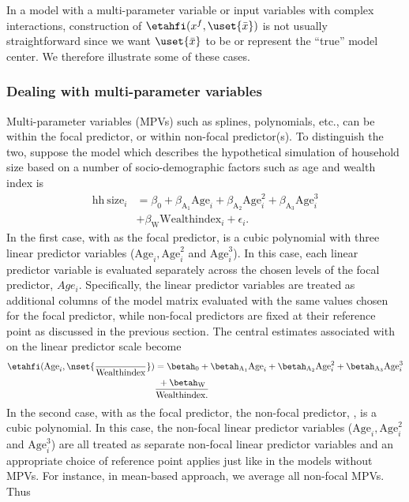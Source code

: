 In a model with a multi-parameter variable or input variables with complex interactions, construction of $\etahfi(x^f, \uset{{\bar{x}}})$ is not usually straightforward since we want $\uset{{\bar{x}}}$ to be or represent the ``true'' model center. We therefore illustrate some of these cases.

\subsubsection{Dealing with multi-parameter variables}


Multi-parameter variables (MPVs) such as splines, polynomials, etc., can be within the focal predictor, or within non-focal predictor(s). To distinguish the two, suppose the model which describes the hypothetical simulation of household size based on a number of socio-demographic factors such as age and wealth index is
%
\begin{align}\label{eq:lm_cubic}
\mathrm{hh~size}_i &= \beta_0 + \beta_{\mathrm{A_1}}\mathrm{Age}_i + \beta_{\mathrm{A_2}}\mathrm{Age}^2_i + \beta_{\mathrm{A_3}}\mathrm{Age}^3_i\nonumber \\
&+ \beta_{\mathrm{W}}\mathrm{Wealthindex}_i + \epsilon_i.
\end{align}
%
In the first case, with  as the focal predictor, is a cubic polynomial with three linear predictor variables ($\mathrm{Age}_i, \mathrm{Age}^2_i$ and $\mathrm{Age}^3_i$). In this case, each linear predictor variable is evaluated separately across the chosen levels of the focal predictor, $Age_i$. Specifically, the linear predictor variables are treated as additional columns of the model matrix evaluated with the same values chosen for the focal predictor, while non-focal predictors are fixed at their reference point as discussed in the previous section. The central estimates associated with  on the linear predictor scale become
%
\begin{align}
\etahfi(\mathrm{Age}_i, \nset{{\over{\mathrm{Wealthindex}}}}) &= \betah_0 + \betah_{\mathrm{A_1}}\mathrm{Age}_i + \betah_{\mathrm{A_2}}\mathrm{Age}^2_i + \betah_{\mathrm{A_3}}\mathrm{Age}^3_i \nonumber\\
	& + \betah_{\mathrm{W}}\over{\mathrm{Wealthindex}}.
\end{align}
%
In the second case, with  as the focal predictor, the non-focal predictor, , is a cubic polynomial. In this case, the non-focal linear predictor variables ($\mathrm{Age}_i, \mathrm{Age}^2_i$ and $\mathrm{Age}^3_i$) are all treated as separate non-focal linear predictor variables and an appropriate choice of reference point applies just like in the models without MPVs. For instance, in mean-based approach, we average all non-focal MPVs. Thus
